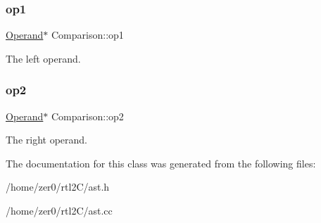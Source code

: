 \subsubsection{\texorpdfstring{op1}{op1}}
{\footnotesize\ttfamily \hyperlink{class_operand}{Operand}$\ast$ Comparison\+::op1\hspace{0.3cm}{\ttfamily [protected]}}

The left operand. \mbox{\label{class_comparison_afe75ca77cb68dce89fe5d3f542aa7c17}} 
\subsubsection{\texorpdfstring{op2}{op2}}
{\footnotesize\ttfamily \hyperlink{class_operand}{Operand}$\ast$ Comparison\+::op2\hspace{0.3cm}{\ttfamily [protected]}}

The right operand. 

The documentation for this class was generated from the following files\+:\begin{DoxyCompactItemize}
\item 
/home/zer0/rtl2\+C/ast.\+h\item 
/home/zer0/rtl2\+C/ast.\+cc\end{DoxyCompactItemize}
